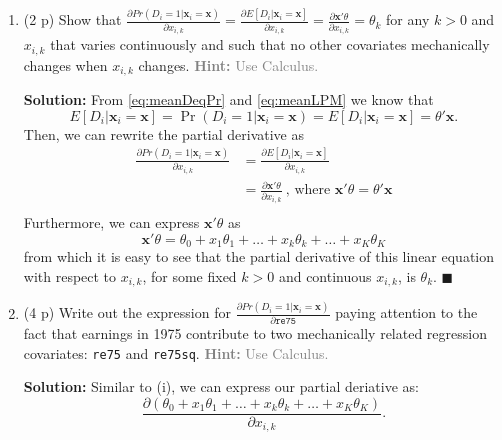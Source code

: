 \documentclass[
]{article}
\begin{document}
\begin{enumerate}
\begin{enumerate}
    \begin{enumerate}
    \def\labelenumiii{\roman{enumiii}.}
    \item
      (2 p) Show that
      \(\frac{\partial Pr(D_i=1|\mathbf{x}_{i}=\mathbf{x})}{\partial x_{i,k}} = \frac{\partial E[D_i|\mathbf{x}_{i}=\mathbf{x}]}{\partial x_{i,k}}= \frac{\partial \mathbf{x}'\theta}{\partial x_{i,k}} = \theta_k\)
      for any \(k >0\) and \(x_{i,k}\) that varies continuously and such
      that no other covariates mechanically changes when \(x_{i,k}\)
      changes. \textcolor{gray}{\textbf{Hint:} Use Calculus.}

      \textbf{Solution:} From \ref{eq:meanDeqPr} and \ref{eq:meanLPM} we
      know that
      \[E[D_i|\mathbf{x}_i=\mathbf{x}]=\Pr(D_i=1|\mathbf{x}_i=\mathbf{x}) = E[D_i|\mathbf{x}_i=\mathbf{x}]=\theta'\mathbf{x}.\]
      Then, we can rewrite the partial derivative as \begin{align*}
       \frac{\partial Pr(D_i=1|\mathbf{x}_{i}=\mathbf{x})}{\partial x_{i,k}} &= \frac{\partial E[D_i|\mathbf{x}_{i}=\mathbf{x}]}{\partial x_{i,k}} \\
       &= \frac{\partial \mathbf{x}'\theta}{\partial x_{i,k}} \ \text{, where $\mathbf{x}'\theta = \theta'\mathbf{x}$}\\ 
       \end{align*} Furthermore, we can express \(\mathbf{x}'\theta\) as
      \[\mathbf{x}'\theta = \theta_0 + x_1 \theta_1 + \ldots + x_k \theta_k + \ldots + x_K \theta_K\]
      from which it is easy to see that the partial derivative of this
      linear equation with respect to \(x_{i,k}\), for some fixed
      \(k > 0\) and continuous \(x_{i, k}\), is \(\theta_k\).
      \hfill \(\blacksquare\) \newline
    \item
      (4 p) Write out the expression for
      \(\frac{\partial Pr(D_i=1|\mathbf{x}_{i}=\mathbf{x})}{\partial \texttt{re75}}\)
      paying attention to the fact that earnings in 1975 contribute to
      two mechanically related regression covariates: \texttt{re75} and
      \texttt{re75sq}.
      \textcolor{gray}{\textbf{Hint:} Use Calculus.}\label{item:lpm:delta-pscore-re75}

      \textbf{Solution:} Similar to (i), we can express our partial
      deriative as:
      \[\frac{\partial (\theta_0 + x_1 \theta_1 + \ldots + x_k \theta_k + \ldots + x_K \theta_K)}{\partial x_{i,k}}.\]


\end{enumerate}
\end{enumerate}
\end{enumerate}
\end{document}
